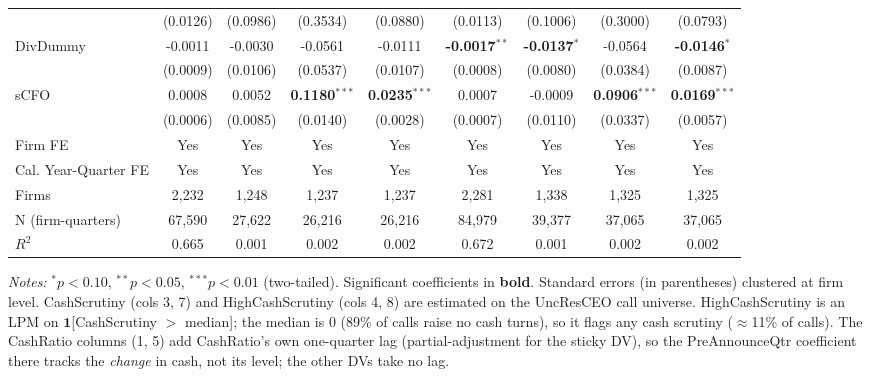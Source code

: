 \begin{table}[htbp]
\begin{tabular}{lcccccccc}
 & (0.0126) & (0.0986) & (0.3534) & (0.0880) & (0.0113) & (0.1006) & (0.3000) & (0.0793) \\
DivDummy & -0.0011 & -0.0030 & -0.0561 & -0.0111 & \textbf{-0.0017}$^{**}$ & \textbf{-0.0137}$^{*}$ & -0.0564 & \textbf{-0.0146}$^{*}$ \\
 & (0.0009) & (0.0106) & (0.0537) & (0.0107) & (0.0008) & (0.0080) & (0.0384) & (0.0087) \\
sCFO & 0.0008 & 0.0052 & \textbf{0.1180}$^{***}$ & \textbf{0.0235}$^{***}$ & 0.0007 & -0.0009 & \textbf{0.0906}$^{***}$ & \textbf{0.0169}$^{***}$ \\
 & (0.0006) & (0.0085) & (0.0140) & (0.0028) & (0.0007) & (0.0110) & (0.0337) & (0.0057) \\
\midrule
Firm FE & Yes & Yes & Yes & Yes & Yes & Yes & Yes & Yes \\
Cal. Year-Quarter FE & Yes & Yes & Yes & Yes & Yes & Yes & Yes & Yes \\
\midrule
Firms & 2,232 & 1,248 & 1,237 & 1,237 & 2,281 & 1,338 & 1,325 & 1,325 \\
N (firm-quarters) & 67,590 & 27,622 & 26,216 & 26,216 & 84,979 & 39,377 & 37,065 & 37,065 \\
$R^2$ & 0.665 & 0.001 & 0.002 & 0.002 & 0.672 & 0.001 & 0.002 & 0.002 \\
\bottomrule
\end{tabular}
\begin{minipage}{\linewidth}
\vspace{2pt}\scriptsize
\textit{Notes:} $^{*}p<0.10$, $^{**}p<0.05$, $^{***}p<0.01$ (two-tailed). 
Significant coefficients in \textbf{bold}. Standard errors (in parentheses) clustered at firm level. CashScrutiny (cols 3, 7) and HighCashScrutiny (cols 4, 8) are estimated on the UncResCEO call universe. HighCashScrutiny is an LPM on $\mathbf{1}$[CashScrutiny $>$ median]; the median is $0$ (89\% of calls raise no cash turns), so it flags any cash scrutiny ($\approx$11\% of calls). The CashRatio columns (1, 5) add CashRatio's own one-quarter lag (partial-adjustment for the sticky DV), so the PreAnnounceQtr coefficient there tracks the \emph{change} in cash, not its level; the other DVs take no lag.
\end{minipage}
\end{table}